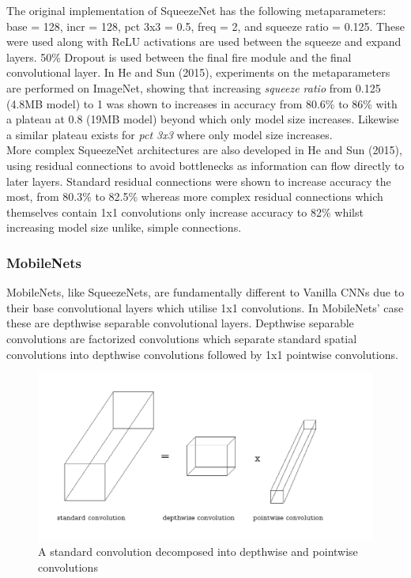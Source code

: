 \documentclass{article}
\begin{document}
The original implementation of SqueezeNet has the following metaparameters: base = 128, incr = 128, pct 3x3 = 0.5, freq = 2, and squeeze ratio = 0.125. These were used along with ReLU activations are used between the squeeze and expand layers. 50\% Dropout is used between the final fire module and the final convolutional layer. In He and Sun (2015), experiments on the metaparameters are performed on ImageNet, showing that increasing \emph{squeeze ratio} from 0.125 (4.8MB model) to 1 was shown to increases in accuracy from 80.6\% to 86\% with a plateau at 0.8 (19MB model) beyond which only model size increases. Likewise a similar plateau exists for \emph{pct 3x3} where only model size increases.\\

More complex SqueezeNet architectures are also developed in He and Sun (2015), using residual connections to avoid bottlenecks as information can flow directly to later layers. Standard residual connections were shown to increase accuracy the most, from 80.3\% to 82.5\% whereas more complex residual connections which themselves contain 1x1 convolutions only increase accuracy to 82\% whilst increasing model size unlike, simple connections.\\

\subsubsection{MobileNets}

MobileNets, like SqueezeNets, are fundamentally different to Vanilla CNNs due to their base convolutional layers which utilise 1x1 convolutions. In MobileNets' case these are depthwise separable convolutional layers. Depthwise separable convolutions are factorized convolutions which separate standard spatial convolutions into depthwise convolutions followed by 1x1 pointwise convolutions.\\

\begin{figure}[!b]
  \includegraphics[width=\linewidth]{separableconv.pdf}
  \caption{A standard convolution decomposed into depthwise and pointwise convolutions}
  \label{fig:dwconvolution}
\end{figure}
\end{document}
